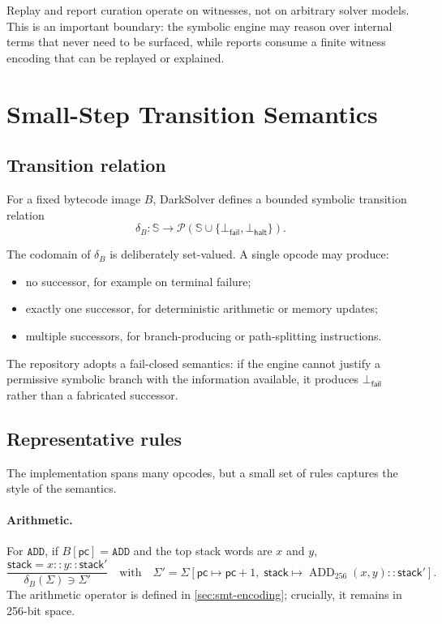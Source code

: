 \documentclass[11pt]{article}
\numberwithin{equation}{section}
\theoremstyle{remark}
\newcommand{\Pow}{\mathcal{P}}
\newcommand{\Fail}{\bot_{\mathsf{fail}}}
\newcommand{\Halt}{\bot_{\mathsf{halt}}}
\newcommand{\StateSpace}{\mathbb{S}}
\newcommand{\Stack}{\mathsf{stack}}
\newcommand{\PC}{\mathsf{pc}}
\begin{document}
Replay and report curation operate on witnesses, not on arbitrary solver models. This is an important boundary: the symbolic engine may reason over internal terms that never need to be surfaced, while reports consume a finite witness encoding that can be replayed or explained.

\section{Small-Step Transition Semantics}
\label{sec:small-step}

\subsection{Transition relation}

For a fixed bytecode image \(B\), DarkSolver defines a bounded symbolic transition relation
\begin{equation}
\label{eq:delta}
\delta_B : \StateSpace \to \Pow(\StateSpace \cup \{\Fail,\Halt\}).
\end{equation}

The codomain of \(\delta_B\) is deliberately set-valued. A single opcode may produce:
\begin{itemize}[leftmargin=1.5em]
  \item no successor, for example on terminal failure;
  \item exactly one successor, for deterministic arithmetic or memory updates;
  \item multiple successors, for branch-producing or path-splitting instructions.
\end{itemize}

The repository adopts a fail-closed semantics: if the engine cannot justify a permissive symbolic branch with the information available, it produces \(\Fail\) rather than a fabricated successor.

\subsection{Representative rules}

The implementation spans many opcodes, but a small set of rules captures the style of the semantics.

\paragraph{Arithmetic.}
For \(\texttt{ADD}\), if \(B[\PC] = \texttt{ADD}\) and the top stack words are \(x\) and \(y\),
\begin{equation}
\label{eq:add-rule}
\frac{
  \Stack = x :: y :: \Stack'
}{
  \delta_B(\Sigma)
  \ni
  \Sigma'
}
\quad
\text{with}
\quad
\Sigma'
=
\Sigma[
\PC \mapsto \PC + 1,\;
\Stack \mapsto \operatorname{ADD}_{256}(x,y) :: \Stack'
].
\end{equation}
The arithmetic operator is defined in \cref{sec:smt-encoding}; crucially, it remains in 256-bit space.
\end{document}
